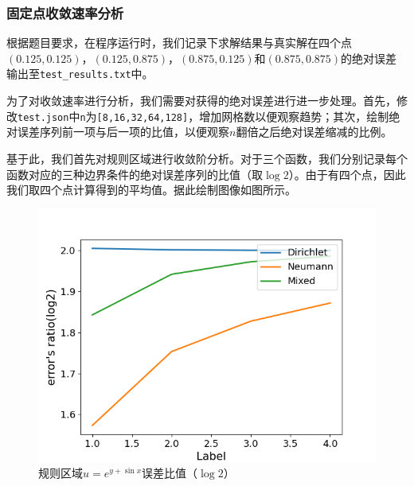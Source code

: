 \documentclass{ctexart}
\begin{document}
\begin{sloppypar}
\subsubsection{固定点收敛速率分析}
根据题目要求，在程序运行时，我们记录下求解结果与真实解在四个点$(0.125,0.125)$，$(0.125,0.875)$，$(0.875,0.125)$和$(0.875,0.875)$的绝对误差输出至\verb|test_results.txt|中。

为了对收敛速率进行分析，我们需要对获得的绝对误差进行进一步处理。首先，修改\verb|test.json|中\verb|n|为\verb|[8,16,32,64,128]|，增加网格数以便观察趋势；其次，绘制绝对误差序列前一项与后一项的比值，以便观察$n$翻倍之后绝对误差缩减的比例。

基于此，我们首先对规则区域进行收敛阶分析。对于三个函数，我们分别记录每个函数对应的三种边界条件的绝对误差序列的比值（取$\log 2$）。由于有四个点，因此我们取四个点计算得到的平均值。据此绘制图像如图所示。
\begin{figure}[H]
\centering
\includegraphics[scale = 0.5]{f1_PE.png}
\caption{规则区域$u=e^{y+\sin x}$误差比值（$\log 2$）}
\label{fig7}
\end{figure}


\end{sloppypar}
\end{document}
